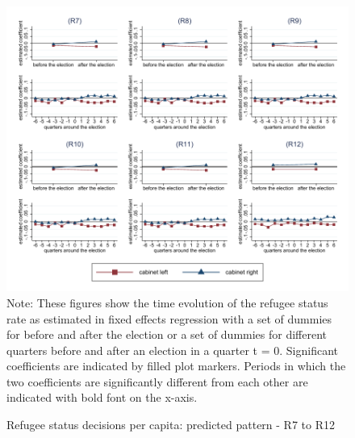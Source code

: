 \documentclass[11pt,a4paper]{scrartcl}
\begin{document}
\clearpage
\FloatBarrier


\clearpage
\FloatBarrier
\begin{figure}[!ht]
	\caption{Refugee status decisions per capita: predicted pattern - R7 to R12}
	\includegraphics[width=1\textwidth]{../results/decisions/refugeestatus_rate_graphs_R7-R12.pdf}
	\scriptsize{Note: These figures show the time evolution of the refugee status rate as estimated in fixed effects regression with a set of dummies for before and after the election or a set of dummies for different quarters before and after an election in a quarter t = 0. Significant coefficients are indicated by filled plot markers. Periods in which the two coefficients are significantly different from each other are indicated with bold font on the x-axis.}
\end{figure}

\clearpage
\FloatBarrier



\clearpage
\FloatBarrier



\clearpage
\FloatBarrier


\end{document}
